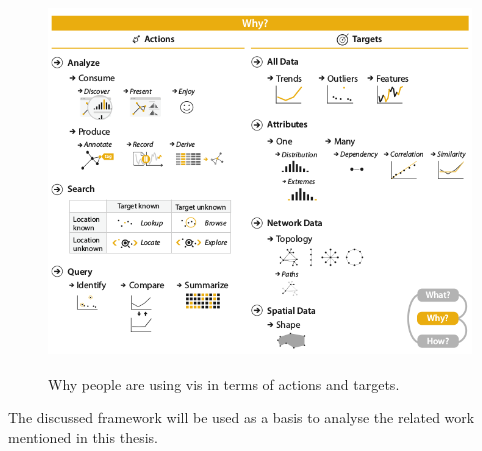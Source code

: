 \begin{figure}[!htb]
\centering
\includegraphics[height=10cm,keepaspectratio]{images/basics/why.png}
\caption[
    Why people are using vis in terms of actions and targets .
]{Why people are using vis in terms of actions and targets.}
\label{fig:why}
\end{figure}

The discussed framework will be used as a basis to analyse the related work mentioned in this thesis.

